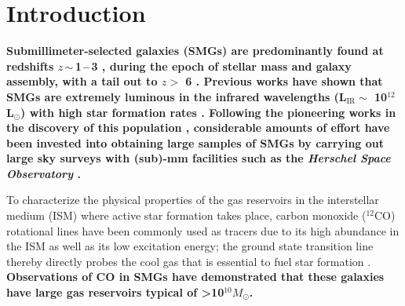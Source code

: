 \documentclass[iop, revtex4]{emulateapj}
\newcommand{\Msun}{\mbox{$M_{\odot}$}}
\newcommand{\Lsun}{\mbox{L$_{\odot}$}}
\newcommand{\eg}{{\sl e.g.,~}}
\newcommand{\pmOne}{\mbox{$^{-1}$}}
\begin{document}
\section{Introduction}\label{sec:intro}
{\bf Submillimeter-selected galaxies (SMGs) are predominantly found at redshifts $z$\,$\sim$\,1\,--\,3 \citep{Chapman05a}, during the epoch of stellar mass and
galaxy assembly, with a tail out to $z>$ 6 \citep{Riechers13a}. 
Previous works %
have shown that SMGs
 are extremely luminous in the infrared
 wavelengths (L$_\textrm{IR} \sim$ 10$^{12}$ \Lsun) with high star formation rates \citep[SFR $\gtrsim$\,500\,\Msun yr\pmOne; see \eg reviews by][]{Blain02a, Lagache05a,Casey14a}.  
{\bf Following the pioneering works in the discovery of this population \citep{Smail97a,Hughes98a,Barger98a}}, considerable amounts of effort have been invested into 
obtaining large samples of SMGs by carrying out
  large sky surveys with (sub)-mm facilities such as the {\it Herschel Space Observatory} \citep[\eg H-ATLAS, SPT, HerMES; ][]{Eales10a,Carlstrom11a,Oliver12a}.  
  }
  
  To characterize the physical properties of the gas reservoirs in the interstellar medium (ISM) where active star formation takes place, carbon monoxide ($^{12}$CO) rotational lines have been commonly used as tracers due to its high abundance in the ISM as well as its low excitation energy; the ground state transition line thereby directly probes the cool gas that is essential to fuel star formation \citep[see \eg reviews by][]{Solomon05a,Carilli13a}.{ \bf Observations of CO in SMGs 
  have demonstrated that these galaxies have large gas reservoirs typical of \textgreater 10$^{10}$\Msun \citep[\eg][]{Frayer98a, Neri03a, Riechers11c, Riechers11d, Ivison11a, Bothwell13a}.}
\end{document}
